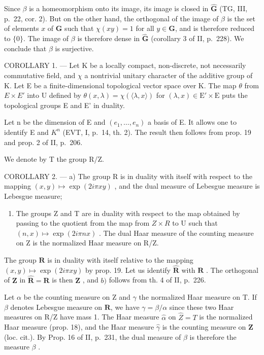 Since \(\beta\) is a homeomorphism onto its image, its image is closed in \(\widehat{\mathbf{G}}\) (TG, III, p.~22, cor. 2). But on the other hand, the orthogonal of the image of \(\beta\) is the set of elements \(x\) of \(\mathbf{G}\) such that \(\chi(xy) = 1\) for all \(y \in \mathbf{G}\), and is therefore reduced to \(\{0\}\). The image of \(\beta\) is therefore dense in \(\widehat{\mathbf{G}}\) (corollary 3 of II, p.~228). We conclude that \(\beta\) is surjective.

COROLLARY 1. --- Let K be a locally compact, non-discrete, not necessarily commutative field, and \(\chi\) a nontrivial unitary character of the additive group of K. Let E be a finite-dimensional topological vector space over K. The map \(\theta\) from \(E \times E'\) into U defined by \(\theta(x,\lambda)=\chi(\langle\lambda,x\rangle)\) for \((\lambda,x)\in\mathrm{E}'\times\mathrm{E}\) puts the topological groups E and E' in duality.

Let n be the dimension of E and \((e_{1},\ldots,e_{n})\) a basis of E. It allows one to identify E and \(K^{n}\) (EVT, I, p.~14, th. 2). The result then follows from prop. 19 and prop. 2 of II, p.~206.

We denote by T the group R/Z.

COROLLARY 2. --- a) The group R is in duality with itself with respect to the mapping \((x,y)\mapsto\exp(2i\pi xy)\) , and the dual measure of Lebesgue measure is Lebesgue measure;

\begin{enumerate}
\def\labelenumi{\alph{enumi})}
\setcounter{enumi}{1}
\tightlist
\item
  The groups Z and T are in duality with respect to the map obtained by passing to the quotient from the map from \(Z \times R\) to U such that \((n, x) \mapsto \exp(2i\pi nx)\) . The dual Haar measure of the counting measure on Z is the normalized Haar measure on R/Z.
\end{enumerate}

The group \(\mathbf{R}\) is in duality with itself relative to the mapping \((x,y)\mapsto \exp (2i\pi xy)\) by prop. 19. Let us identify \(\widehat{\mathbf{R}}\) with \(\mathbf{R}\) . The orthogonal of \(\mathbf{Z}\) in \(\widehat{\mathbf{R}} = \mathbf{R}\) is then \(\mathbf{Z}\) , and \(b)\) follows from th. 4 of II, p.~226.

Let \(\alpha\) be the counting measure on Z and \(\gamma\) the normalized Haar measure on T. If \(\beta\) denotes Lebesgue measure on \(\mathbf{R}\), we have \(\gamma = \beta/\alpha\) since these two Haar measures on R/Z have mass 1. The Haar measure \(\widehat{\alpha}\) on \(\widehat{Z} = T\) is the normalized Haar measure (prop. 18), and the Haar measure \(\widehat{\gamma}\) is the counting measure on \(\mathbf{Z}\) (loc. cit.). By Prop. 16 of II, p.~231, the dual measure of \(\beta\) is therefore the measure \(\beta\) .

